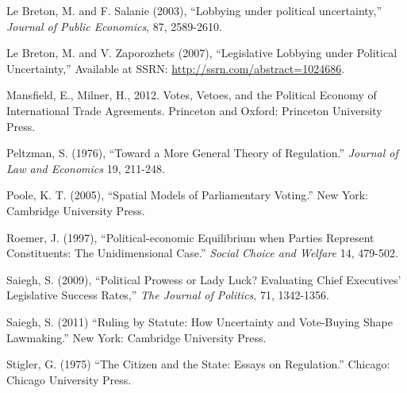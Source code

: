 \documentclass[12pt]{article}
\begin{document}
\begin{list}{}{\setlength{\leftmargin}{0.3in}\setlength{\rightmargin}{0.0in}\setlength{\itemindent}{-0.3in}\setlength{\itemsep}{0.0in}}
\item Le Breton, M. and F. Salanie (2003), ``Lobbying under political uncertainty,'' {\em Journal of Public Economics}, 87, 2589-2610.

\item Le Breton, M. and V. Zaporozhets (2007), ``Legislative Lobbying under Political Uncertainty,'' Available at SSRN: \url{http://ssrn.com/abstract=1024686}.

\item Mansfield, E., Milner, H., 2012. Votes, Vetoes, and the Political Economy of International Trade Agreements. Princeton and Oxford: Princeton  University Press.

\item Peltzman, S. (1976), ``Toward a More General Theory of Regulation.'' {\em Journal of Law and Economics} 19, 211-248.

\item Poole, K. T. (2005), ``Spatial Models of Parliamentary Voting.'' New York: Cambridge University Press.

\item Roemer, J. (1997), ``Political-economic Equilibrium when Parties Represent Constituents: The Unidimensional Case.'' {\em Social Choice and Welfare} 14, 479-502.

\item Saiegh, S. (2009), ``Political  Prowess or Lady Luck? Evaluating Chief Executives' Legislative Success Rates,'' {\em The Journal of Politics}, 71, 1342-1356.

\item Saiegh, S. (2011) ``Ruling by Statute: How Uncertainty and Vote-Buying Shape Lawmaking.'' New York: Cambridge University Press.

\item Stigler, G. (1975) ``The Citizen and the State: Essays on Regulation.'' Chicago: Chicago University Press.

\end{list}
\end{document}
